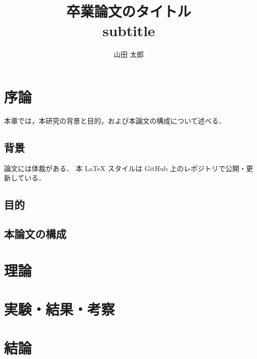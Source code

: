 \documentclass[a4paper,dvipdfmx]{jsarticle}
\title{卒業論文のタイトル\\subtitle}
\author{山田 太郎}
\begin{document}
\maketitle

\section{序論}
本章では，本研究の背景と目的，および本論文の構成について述べる．
\subsection{背景}
論文には体裁がある．
本 LaTeX スタイルは GitHub 上のレポジトリ\cite{miino2023github}で公開・更新している．

\subsection{目的}

\subsection{本論文の構成}

\newpage
\section{理論}

\clearpage
\section{実験・結果・考察}

\newpage
\section{結論}


\end{document}
